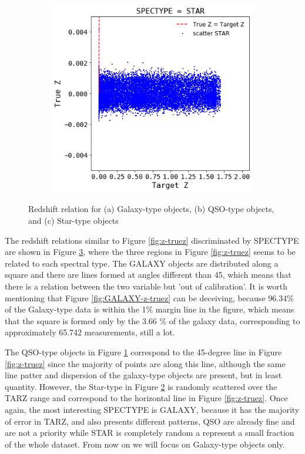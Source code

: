 \begin{figure}
\begin{subfigure}[b]{0.5\textwidth}
		\caption{}
		\label{fig:QSO-z-truez}
	\end{subfigure}
	\begin{subfigure}[b]{0.5\textwidth}
	\includegraphics[width=1\linewidth]{TeX_files/Imagenes/STAR-z-truez}
	\caption{}
	\label{fig:STAR-z-truez}
	\end{subfigure}
	\caption{ Redshift relation for (a) Galaxy-type objects, (b) QSO-type objects, and (c) Star-type objects }
	\label{fig:SPECTYPE-z-truez}
\end{figure}

The redshift relations similar to Figure \ref{fig:z-truez} discriminated by SPECTYPE are shown in Figure \ref{fig:SPECTYPE-z-truez}, where the three regions in Figure \ref{fig:z-truez} seems to be related to each spectral type. The GALAXY objects are distributed along a square and there are lines formed at angles different than 45, which means that there is a relation between the two variable but 'out of calibration'. It is worth mentioning that Figure \ref{fig:GALAXY-z-truez}  can be deceiving, because 96.34\% of the Galaxy-type data is within the 1\% margin line in the figure, which means that the square is formed only by the 3.66 \% of the galaxy data, corresponding to approximately  65.742 measurements, still a lot. 

The QSO-type objects in Figure \ref{fig:QSO-z-truez} correspond to the 45-degree line in Figure \ref{fig:z-truez} since the majority of points are along this line, although the same line patter and dispersion of the galaxy-type objects are present, but in least quantity. However, the Star-type in Figure \ref{fig:STAR-z-truez} is randomly scattered over the TARZ range and correspond to the horizontal line in Figure \ref{fig:z-truez}. Once again, the most interesting SPECTYPE is GALAXY, because it has the majority of error in TARZ, and also presents different patterns, QSO are already fine and are not a priority while STAR is completely random a represent a small fraction of the whole dataset. From now on we will focus on Galaxy-type objects only.  

